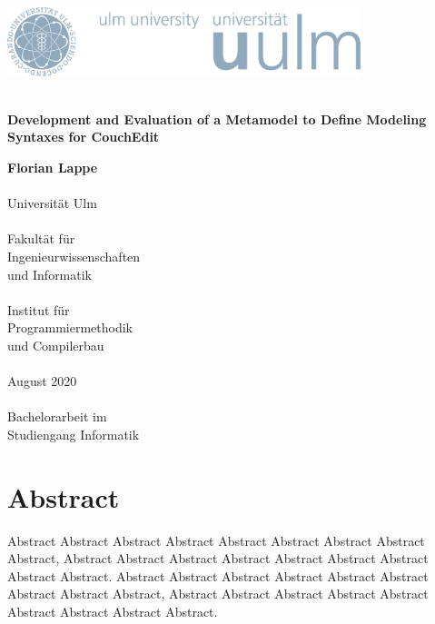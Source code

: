 \documentclass[
a4paper,
numbers=noenddot,      %
bibliography=totoc,              %
BCOR=15mm,               %
leqno					%
]{scrbook}
\newcommand{\fullname}{Florian Lappe}
\newcommand{\titel}{}
\newcommand{\untertitel}{Development and Evaluation of a Metamodel to Define Modeling Syntaxes for CouchEdit}
\newcommand{\abgabedatum}{August 2020}
\newcommand{\abschlussarbeit}{Bachelorarbeit}
\begin{document}
\frontmatter %


\begin{titlepage}
  \selectfont %
	\hfill\includegraphics[height=2.0cm]{images/logo_100_sRGB}\\[3.5cm] %
	\begin{flushright}
		\Huge \textbf{\titel}\\[0.2cm]
		\fontsize{19}{20}\selectfont \textbf{\untertitel}\\
	\end{flushright}
	
	\vfill\hfill
	\parbox[t]{4.6cm}{
		\singlespacing
		\large
		\textbf{\fullname}\\
		\\
		Universität Ulm\\
		\\
		Fakultät für\\
		Ingenieurwissenschaften\\
		und Informatik\\
		\\
		Institut für\\
		Programmiermethodik\\
		und Compilerbau\\
		\\
		\abgabedatum\\
		\\
		{\abschlussarbeit} im\\
		Studiengang Informatik
	}
\end{titlepage}
\restoregeometry


\clearpage
\thispagestyle{empty}
\chapter*{Abstract}


Abstract Abstract Abstract Abstract Abstract Abstract Abstract Abstract Abstract,
Abstract Abstract Abstract Abstract Abstract Abstract Abstract Abstract Abstract.
Abstract Abstract Abstract Abstract Abstract Abstract Abstract Abstract Abstract,
Abstract Abstract Abstract Abstract Abstract Abstract Abstract Abstract Abstract.
\end{document}
